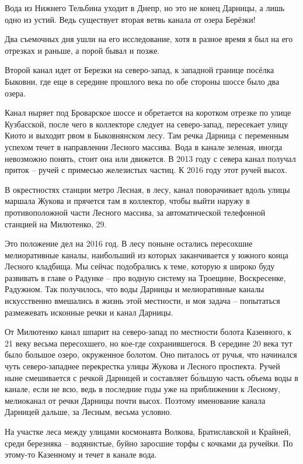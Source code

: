 Вода из Нижнего Тельбина уходит в Днепр, но это не конец Дарницы, а лишь одно из устий. Ведь существует вторая ветвь канала от озера Берёзки!

Два съемочных дня ушли на его исследование, хотя в разное время я был на его отрезках и раньше, а порой бывал и позже.

Второй канал идет от Березки на северо-запад, к западной границе посёлка Быковни, где еще в середине прошлого века по обе стороны шоссе было два озера.

Канал ныряет под Броварское шоссе и обретается на коротком отрезке по улице Кузбасской, после чего в коллекторе следует на северо-запад, пересекает улицу Киото и выходит рвом в Быковнянском лесу. Там речка Дарница с переменным успехом течет в направлении Лесного массива. Вода в канале зеленая, иногда невозможно понять, стоит она или движется. В 2013 году с севера канал получал приток – ручей с примесью железистых частиц. К 2016 году этот ручей высох.

В окрестностях станции метро Лесная, в лесу, канал поворачивает вдоль улицы маршала Жукова и прячется там в коллектор, чтобы выйти наружу в противоположной части Лесного массива, за автоматической телефонной станцией на Милютенко, 29.

Это положение дел на 2016 год. В лесу поныне остались пересохшие мелиоративные каналы, наибольший из которых заканчивается у южного конца Лесного кладбища. Мы сейчас подобрались к теме, которую я широко буду развивать в главе о Радунке – про водную систему на Троещине, Воскресенке, Радужном. Так получилось, что воды Дарницы и мелиоративные каналы искусственно вмешались в жизнь этой местности, и моя задача – попытаться размежевать исконные речки и канал Дарницы.

От Милютенко канал шпарит на северо-запад по местности болота Казенного, к 21 веку весьма пересохшего, но кое-где сохранившегося. В середине 20 века тут было большое озеро, окруженное болотом. Оно питалось от ручья, что начинался чуть северо-западнее перекрестка улицы Жукова и Лесного проспекта. Ручей ныне смешивается с речкой Дарницей и составляет б\'ольшую часть объема воды в канале, если не всю, ведь в последние годы уже на приближении к Лесному, мелиоканал от речки Дарницы почти высох. Поэтому именование канала Дарницей дальше, за Лесным, весьма условно.

На участке леса между улицами космонавта Волкова, Братиславской и Крайней, среди березняка – водянистые, буйно заросшие торфы с кочками да ручейки. По этому-то Казенному и течет в канале вода.

